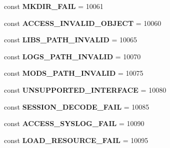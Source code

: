 \begin{DoxyCompactItemize}
\item 
\hypertarget{class_able_polecat___error_ab2d04f6cf478ae3f3c46bdd076643de7}{}const {\bfseries M\+K\+D\+I\+R\+\_\+\+F\+A\+I\+L} = 10061\label{class_able_polecat___error_ab2d04f6cf478ae3f3c46bdd076643de7}

\item 
\hypertarget{class_able_polecat___error_a3cbe14e7ed128fbe467769f1244b3227}{}const {\bfseries A\+C\+C\+E\+S\+S\+\_\+\+I\+N\+V\+A\+L\+I\+D\+\_\+\+O\+B\+J\+E\+C\+T} = 10060\label{class_able_polecat___error_a3cbe14e7ed128fbe467769f1244b3227}

\item 
\hypertarget{class_able_polecat___error_a34405bb2140498b98a3821f5a6368998}{}const {\bfseries L\+I\+B\+S\+\_\+\+P\+A\+T\+H\+\_\+\+I\+N\+V\+A\+L\+I\+D} = 10065\label{class_able_polecat___error_a34405bb2140498b98a3821f5a6368998}

\item 
\hypertarget{class_able_polecat___error_abc308e9b4e75d061071f04c068ce98f8}{}const {\bfseries L\+O\+G\+S\+\_\+\+P\+A\+T\+H\+\_\+\+I\+N\+V\+A\+L\+I\+D} = 10070\label{class_able_polecat___error_abc308e9b4e75d061071f04c068ce98f8}

\item 
\hypertarget{class_able_polecat___error_a585564c5211bed1b2fe747618fde45b9}{}const {\bfseries M\+O\+D\+S\+\_\+\+P\+A\+T\+H\+\_\+\+I\+N\+V\+A\+L\+I\+D} = 10075\label{class_able_polecat___error_a585564c5211bed1b2fe747618fde45b9}

\item 
\hypertarget{class_able_polecat___error_aef4266864007d808388d559a964349f4}{}const {\bfseries U\+N\+S\+U\+P\+P\+O\+R\+T\+E\+D\+\_\+\+I\+N\+T\+E\+R\+F\+A\+C\+E} = 10080\label{class_able_polecat___error_aef4266864007d808388d559a964349f4}

\item 
\hypertarget{class_able_polecat___error_a0c2fecc2033d383dd02f364499173f2e}{}const {\bfseries S\+E\+S\+S\+I\+O\+N\+\_\+\+D\+E\+C\+O\+D\+E\+\_\+\+F\+A\+I\+L} = 10085\label{class_able_polecat___error_a0c2fecc2033d383dd02f364499173f2e}

\item 
\hypertarget{class_able_polecat___error_a9bbdb4ef3ce14c7a622f8313f187f5ab}{}const {\bfseries A\+C\+C\+E\+S\+S\+\_\+\+S\+Y\+S\+L\+O\+G\+\_\+\+F\+A\+I\+L} = 10090\label{class_able_polecat___error_a9bbdb4ef3ce14c7a622f8313f187f5ab}

\item 
\hypertarget{class_able_polecat___error_a3e7f2f52f71e3fd1047bc60e4ee3da0b}{}const {\bfseries L\+O\+A\+D\+\_\+\+R\+E\+S\+O\+U\+R\+C\+E\+\_\+\+F\+A\+I\+L} = 10095\label{class_able_polecat___error_a3e7f2f52f71e3fd1047bc60e4ee3da0b}


\end{DoxyCompactItemize}
